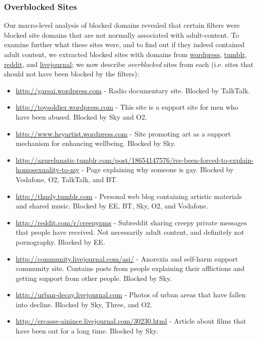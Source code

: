 \documentclass{bmcart}
\begin{document}
\subsubsection*{Overblocked Sites}
Our macro-level analysis of blocked domains revealed that certain filters were blocked site domains that are not normally associated with adult-content.
To examine further what these sites were, and to find out if they indeed contained adult content, we extracted blocked sites with domains from \url{wordpress}, \url{tumblr}, \url{reddit}, and \url{livejournal}; we now describe \textit{overblocked} sites from each (i.e. sites that should not have been blocked by the filters):

\begin{itemize}
	\item \url{http://garsai.wordpress.com} - Radio documentary site. Blocked by TalkTalk. 
	\item \url{http://toysoldier.wordpress.com} - This site is a support site for men who have been abused. Blocked by Sky and O2.
	\item \url{http://www.heyartist.wordpress.com} - Site promoting art as a support mechanism for enhancing wellbeing. Blocked by Sky.
	\item \url{http://azurelunatic.tumblr.com/post/18654147576/ive-been-forced-to-explain-homosexuality-to-my} - Page explaining why someone is gay. Blocked by Vodafone, O2, TalkTalk, and BT.
	\item \url{http://thusly.tumblr.com} - Personal web blog containing artistic materials and shared music. Blocked by EE, BT, Sky, O2, and Vodafone.
	\item \url{http://reddit.com/r/creepypms} - Subreddit sharing creepy private messages that people have received. Not necessarily adult content, and definitely not pornography. Blocked by EE.
	\item \url{http://community.livejournal.com/asi/} - Anorexia and self-harm support community site. Contains posts from people explaining their afflictions and getting support from other people. Blocked by Sky.
	\item \url{http://urban-decay.livejournal.com} - Photos of urban areas that have fallen into decline. Blocked by Sky, Three, and O2.
	\item \url{http://ercasse-ainince.livejournal.com/30230.html} - Article about films that have been out for a long time. Blocked by Sky.
\end{itemize}
\end{document}
